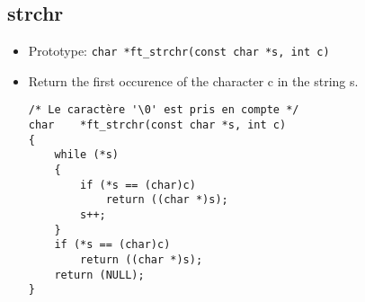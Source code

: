 \documentclass{article}
\begin{document}
		\subsection{strchr}
			\begin{itemize}[label=$\rightarrow$]
				\item Prototype: \texttt{char    *ft\_strchr(const char *s, int c)}
				\item Return the first occurence of the character c in the string s.
				\begin{verbatim}
/* Le caractère '\0' est pris en compte */                                      
char    *ft_strchr(const char *s, int c)                                        
{                                                                               
    while (*s)                                                                  
    {                                                                           
        if (*s == (char)c)                                                      
            return ((char *)s);                                                 
        s++;                                                                    
    }                                                                           
    if (*s == (char)c)                                                          
        return ((char *)s);                                                     
    return (NULL);                                                              
}   
				\end{verbatim}
			\end{itemize}
		
\end{document}
